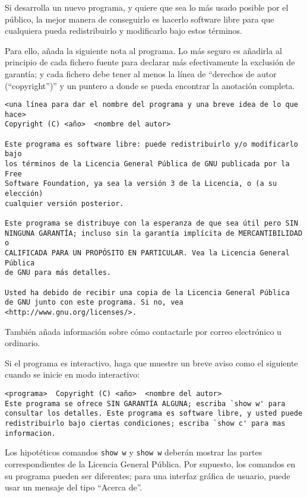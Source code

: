 \documentclass[11pt]{article}
\begin{document}
\begin{enumerate}
Si desarrolla un nuevo programa, y quiere que sea lo m\'{a}s usado posible por
el p\'{u}blico, la mejor manera de conseguirlo es hacerlo software libre para que
cualquiera pueda redistribuirlo y modificarlo bajo estos t\'{e}rminos.

Para ello, a\~nada la siguiente nota al programa. Lo m\'{a}s seguro es a\~nadirla
al principio de cada fichero fuente para declarar m\'{a}s efectivamente la
exclusi\'{o}n de garant\'{i}a; y cada fichero debe tener al menos la l\'{i}nea de ``derechos de autor (``copyright'')''
y un puntero a donde se pueda encontrar la anotaci\'{o}n completa.

{\footnotesize
\begin{verbatim}
<una línea para dar el nombre del programa y una breve idea de lo que hace>
Copyright (C) <año>  <nombre del autor>
    
Este programa es software libre: puede redistribuirlo y/o modificarlo bajo
los términos de la Licencia General Pública de GNU publicada por la Free
Software Foundation, ya sea la versión 3 de la Licencia, o (a su elección)
cualquier versión posterior.
    
Este programa se distribuye con la esperanza de que sea útil pero SIN
NINGUNA GARANTÍA; incluso sin la garantía implícita de MERCANTIBILIDAD o
CALIFICADA PARA UN PROPÓSITO EN PARTICULAR. Vea la Licencia General Pública 
de GNU para más detalles.
    
Usted ha debido de recibir una copia de la Licencia General Pública 
de GNU junto con este programa. Si no, vea <http://www.gnu.org/licenses/>.
\end{verbatim}
}

Tambi\'{e}n a\~nada informaci\'{o}n sobre c\'{o}mo contactarle por correo electr\'{o}nico u
ordinario.

Si el programa es interactivo, haga que muestre un breve aviso como el 
siguiente cuando se inicie en modo interactivo:

{\footnotesize
\begin{verbatim}
<programa>  Copyright (C) <año>  <nombre del autor>
Este programa se ofrece SIN GARANTÍA ALGUNA; escriba `show w' para 
consultar los detalles. Este programa es software libre, y usted puede 
redistribuirlo bajo ciertas condiciones; escriba `show c' para mas 
informacion.
\end{verbatim}
}

Los hipot\'{e}ticos comandos {\tt show w} y {\tt show w} deber\'{a}n mostrar las partes 
correspondientes de la Licencia General P\'{u}blica. Por supuesto, los comandos 
en su programa pueden ser diferentes; para una interfaz gr\'{a}fica de usuario, 
puede usar un mensaje del tipo ``Acerca de''.


\end{enumerate}
\end{document}
